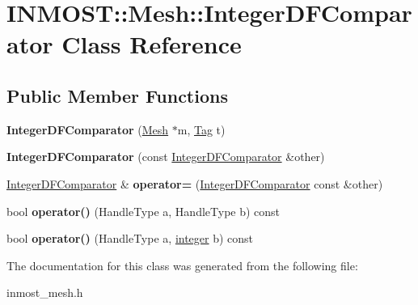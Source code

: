 \hypertarget{classINMOST_1_1Mesh_1_1IntegerDFComparator}{\section{I\-N\-M\-O\-S\-T\-:\-:Mesh\-:\-:Integer\-D\-F\-Comparator Class Reference}
\label{classINMOST_1_1Mesh_1_1IntegerDFComparator}
}
\subsection*{Public Member Functions}
\begin{DoxyCompactItemize}
\item 
\hypertarget{classINMOST_1_1Mesh_1_1IntegerDFComparator_a57bee2323b04b1891182e8bbfcb8063a}{{\bfseries Integer\-D\-F\-Comparator} (\hyperlink{classINMOST_1_1Mesh}{Mesh} $\ast$m, \hyperlink{classINMOST_1_1Tag}{Tag} t)}\label{classINMOST_1_1Mesh_1_1IntegerDFComparator_a57bee2323b04b1891182e8bbfcb8063a}

\item 
\hypertarget{classINMOST_1_1Mesh_1_1IntegerDFComparator_a26ffe919a208756099d6e335050122ff}{{\bfseries Integer\-D\-F\-Comparator} (const \hyperlink{classINMOST_1_1Mesh_1_1IntegerDFComparator}{Integer\-D\-F\-Comparator} \&other)}\label{classINMOST_1_1Mesh_1_1IntegerDFComparator_a26ffe919a208756099d6e335050122ff}

\item 
\hypertarget{classINMOST_1_1Mesh_1_1IntegerDFComparator_ad25cdf693d82edbce170a7aa114bb881}{\hyperlink{classINMOST_1_1Mesh_1_1IntegerDFComparator}{Integer\-D\-F\-Comparator} \& {\bfseries operator=} (\hyperlink{classINMOST_1_1Mesh_1_1IntegerDFComparator}{Integer\-D\-F\-Comparator} const \&other)}\label{classINMOST_1_1Mesh_1_1IntegerDFComparator_ad25cdf693d82edbce170a7aa114bb881}

\item 
\hypertarget{classINMOST_1_1Mesh_1_1IntegerDFComparator_afff0d1793113eb0d1a8f90e98d5c118a}{bool {\bfseries operator()} (Handle\-Type a, Handle\-Type b) const }\label{classINMOST_1_1Mesh_1_1IntegerDFComparator_afff0d1793113eb0d1a8f90e98d5c118a}

\item 
\hypertarget{classINMOST_1_1Mesh_1_1IntegerDFComparator_a0d9e6ecec378cedd4ae3cca369da852e}{bool {\bfseries operator()} (Handle\-Type a, \hyperlink{classINMOST_1_1Storage_aec96942bc647417a801e2895b45964d2}{integer} b) const }\label{classINMOST_1_1Mesh_1_1IntegerDFComparator_a0d9e6ecec378cedd4ae3cca369da852e}

\end{DoxyCompactItemize}


The documentation for this class was generated from the following file\-:\begin{DoxyCompactItemize}
\item 
inmost\-\_\-mesh.\-h\end{DoxyCompactItemize}
